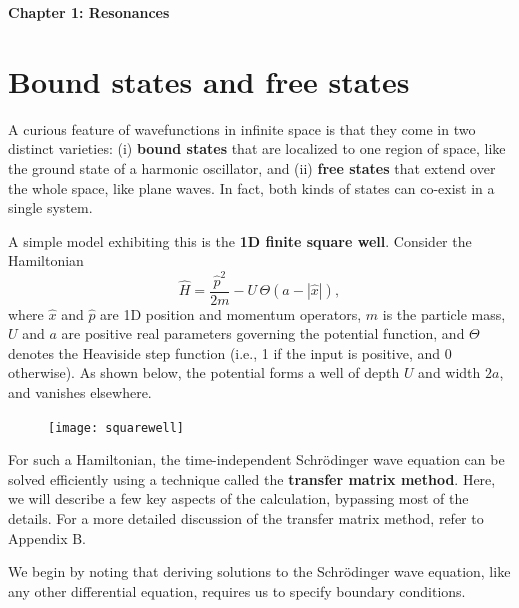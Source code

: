 \documentclass[pra,12pt]{revtex4}
\begin{document}
\begin{center}
{\Large \textbf{Chapter 1: Resonances}}
\end{center}

\section{Bound states and free states}

A curious feature of wavefunctions in infinite space is that they come
in two distinct varieties: (i) \textbf{bound states} that are
localized to one region of space, like the ground state of a harmonic
oscillator, and (ii) \textbf{free states} that extend over the whole
space, like plane waves.  In fact, both kinds of states can co-exist
in a single system.

A simple model exhibiting this is the \textbf{1D finite square well}.
Consider the Hamiltonian
\begin{equation}
  \hat{H} = \frac{\hat{p}^2}{2m} - U \,\Theta(a -|\hat{x}|),
\end{equation}
where $\hat{x}$ and $\hat{p}$ are 1D position and momentum operators,
$m$ is the particle mass, $U$ and $a$ are positive real parameters
governing the potential function, and $\Theta$ denotes the Heaviside
step function (i.e., 1 if the input is positive, and 0 otherwise).  As
shown below, the potential forms a well of depth $U$ and width $2a$,
and vanishes elsewhere.

\begin{figure}[h]
  \centering\texttt{[image: squarewell]}
\end{figure}

For such a Hamiltonian, the time-independent Schr\"odinger wave
equation can be solved efficiently using a technique called the
\textbf{transfer matrix method}.  Here, we will describe a few key
aspects of the calculation, bypassing most of the details.  For a more
detailed discussion of the transfer matrix method, refer to Appendix
B.

We begin by noting that deriving solutions to the Schr\"odinger wave
equation, like any other differential equation, requires us to specify
boundary conditions.
\end{document}
